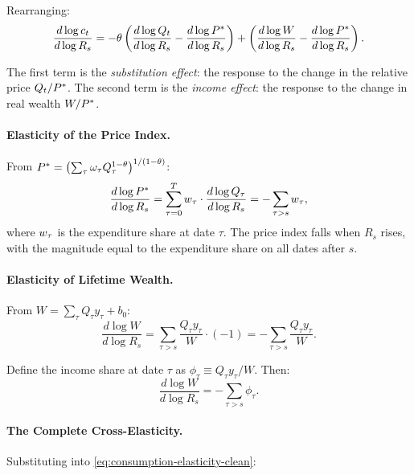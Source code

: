 Rearranging:
\begin{equation}
\frac{d \log c_t}{d \log R_s} = -\theta \left( \frac{d \log Q_t}{d \log R_s} - \frac{d \log P^{*}}{d \log R_s} \right) + \left( \frac{d \log W}{d \log R_s} - \frac{d \log P^{*}}{d \log R_s} \right).
\label{eq:consumption-elasticity-clean}
\end{equation}

The first term is the \emph{substitution effect}: the response to the change in the relative price $Q_t / P^{*}$. The second term is the \emph{income effect}: the response to the change in real wealth $W / P^{*}$.

\paragraph{Elasticity of the Price Index.}
From $P^{*} = \left( \sum_{\tau} \omega_{\tau} Q_{\tau}^{1-\theta} \right)^{1/(1-\theta)}$:
\begin{equation}
\frac{d \log P^{*}}{d \log R_s} = \sum_{\tau=0}^{T} w_{\tau} \cdot \frac{d \log Q_{\tau}}{d \log R_s} = -\sum_{\tau > s} w_{\tau},
\label{eq:P-R-elasticity}
\end{equation}
where $w_{\tau}$ is the expenditure share at date $\tau$. The price index falls when $R_s$ rises, with the magnitude equal to the expenditure share on all dates after $s$.

\paragraph{Elasticity of Lifetime Wealth.}
From $W = \sum_{\tau} Q_{\tau} y_{\tau} + b_0$:
\begin{equation}
\frac{d \log W}{d \log R_s} = \sum_{\tau > s} \frac{Q_{\tau} y_{\tau}}{W} \cdot (-1) = -\sum_{\tau > s} \frac{Q_{\tau} y_{\tau}}{W}.
\label{eq:W-R-elasticity}
\end{equation}

Define the income share at date $\tau$ as $\phi_{\tau} \equiv Q_{\tau} y_{\tau} / W$. Then:
\begin{equation}
\frac{d \log W}{d \log R_s} = -\sum_{\tau > s} \phi_{\tau}.
\label{eq:W-R-elasticity-clean}
\end{equation}

\paragraph{The Complete Cross-Elasticity.}
Substituting into \cref{eq:consumption-elasticity-clean}:

